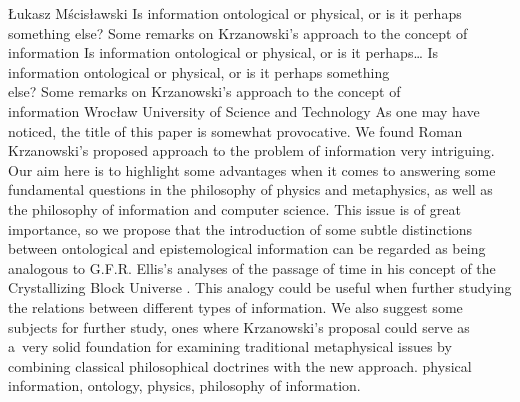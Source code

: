 \begin{artengenv}{Łukasz Mścisławski}
	{Is information ontological or physical, or is it perhaps something else? Some remarks on Krzanowski's approach to the concept of information}
	{Is information ontological or physical, or is it perhaps\ldots}
	{Is information ontological or physical, or is it perhaps something\\else? Some remarks on Krzanowski's approach to the concept of\\information}
	{Wrocław University of Science and Technology}
	{\label{mscislaw_start}As one may have noticed, the title of this paper is somewhat provocative. We found Roman Krzanowski's
	\parencites*[][]{krzanowski_does_2020}[][]{krzanowski_what_2020}[][]{krzanowski_why_2020}[][]{krzanowski_ontological_2022} %
	 proposed approach to the problem of information very intriguing. Our aim here is to highlight some advantages when it comes to answering some fundamental questions in the philosophy of physics and metaphysics, as well as the philosophy of information and computer science. This issue is of great importance, so we propose that the introduction of some subtle distinctions between ontological and epistemological information can be regarded as being analogous to G.F.R. Ellis's analyses of the passage of time in his concept of the Crystallizing Block Universe 
	\parencite[][]{ellis_space_2012}. %
	 This analogy could be useful when further studying the relations between different types of information. We also suggest some subjects for further study, ones where Krzanowski's proposal could serve as a~very solid foundation for examining traditional metaphysical issues by combining classical philosophical doctrines with the new approach.
	}
	{physical information, ontology, physics, philosophy of information.}



\end{artengenv}
